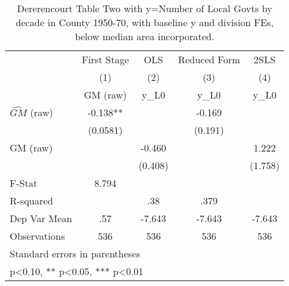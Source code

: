 \begin{table}[htbp]\centering
\def\sym#1{\ifmmode^{#1}\else\(^{#1}\)\fi}
\caption{Dererencourt Table Two with y=Number of Local Govts by decade in County 1950-70, with baseline y and division FEs, below median area incorporated.}
\begin{tabular}{l*{4}{c}}
\toprule
                    & First Stage   &         OLS   &Reduced Form   &        2SLS   \\
                    &\multicolumn{1}{c}{(1)}&\multicolumn{1}{c}{(2)}&\multicolumn{1}{c}{(3)}&\multicolumn{1}{c}{(4)}\\
                    &\multicolumn{1}{c}{GM  (raw)}&\multicolumn{1}{c}{y\_L0}&\multicolumn{1}{c}{y\_L0}&\multicolumn{1}{c}{y\_L0}\\
\midrule
$\hat{GM}$ (raw)    &      -0.138** &               &      -0.169   &               \\
                    &    (0.0581)   &               &     (0.191)   &               \\
\addlinespace
GM  (raw)           &               &      -0.460   &               &       1.222   \\
                    &               &     (0.408)   &               &     (1.758)   \\
\midrule
F-Stat              &       8.794   &               &               &               \\
R-squared           &               &         .38   &        .379   &               \\
Dep Var Mean        &         .57   &      -7.643   &      -7.643   &      -7.643   \\
Observations        &         536   &         536   &         536   &         536   \\
\bottomrule
\multicolumn{5}{l}{\footnotesize Standard errors in parentheses}\\
\multicolumn{5}{l}{\footnotesize * p<0.10, ** p<0.05, *** p<0.01}\\
\end{tabular}
\end{table}
